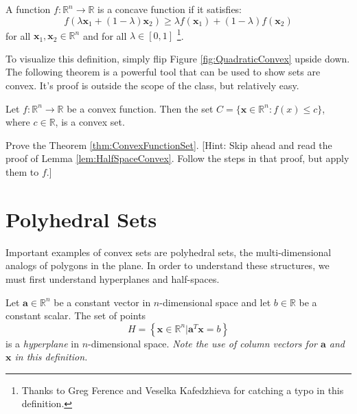 \begin{definition} A function $f:\mathbb{R}^n \rightarrow \mathbb{R}$ is a concave function if it satisfies:
\begin{equation}
f(\lambda\mathbf{x}_1 + (1-\lambda)\mathbf{x}_2) \geq \lambda f(\mathbf{x}_1) + (1-\lambda)f(\mathbf{x}_2)
\end{equation}
for all $\mathbf{x}_1,\mathbf{x}_2 \in \mathbb{R}^n$ and for all $\lambda \in [0,1]$ \footnote{Thanks to Greg Ference and Veselka Kafedzhieva for catching a typo in this definition.}. 
\end{definition}
To visualize this definition, simply flip Figure \ref{fig:QuadraticConvex} upside down. The following theorem is a powerful tool that can be used to show sets are convex. It's proof is outside the scope of the class, but relatively easy. 
\begin{theorem} Let $f:\mathbb{R}^n \rightarrow \mathbb{R}$ be a convex function. Then the set $C = \{\mathbf{x} \in \mathbb{R}^n : f(x) \leq c\}$, where $c \in \mathbb{R}$, is a convex set. 
\label{thm:ConvexFunctionSet}
\end{theorem}

\begin{exercise} Prove the Theorem \ref{thm:ConvexFunctionSet}. [Hint: Skip ahead and read the proof of Lemma \ref{lem:HalfSpaceConvex}. Follow the steps in that proof, but apply them to $f$.]
\end{exercise}

\section{Polyhedral Sets}
Important examples of convex sets are polyhedral sets, the multi-dimensional analogs of polygons in the plane. In order to understand these structures, we must first understand hyperplanes and half-spaces. 

\begin{definition}[Hyperplane] Let $\mathbf{a} \in \mathbb{R}^n$ be a constant vector in $n$-dimensional space and let $b \in \mathbb{R}$ be a constant scalar. The set of points 
\begin{equation}
H = \left\{\mathbf{x} \in \mathbb{R}^n | 
\mathbf{a}^T\mathbf{x} = b\right\}
\end{equation}
is a \textit{hyperplane} in $n$-dimensional space. \textit{Note the use of column vectors for $\mathbf{a}$ and $\mathbf{x}$ in this definition.}
\end{definition}

